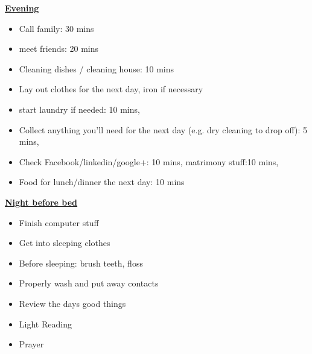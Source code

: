 \begin{columns}
\begin{column}{0.333\columnwidth}
\underline{\bf Evening}
\begin{itemize}
\tiny \item \tiny Call family: 30 mins
\item \tiny meet friends: 20 mins
\item \tiny Cleaning dishes / cleaning house: 10 mins
\item \tiny Lay out clothes for the next day, iron if necessary
\item \tiny start laundry if needed: 10 mins,
\item \tiny Collect anything you’ll need for the next day (e.g. dry
cleaning to drop off): 5 mins,
\item \tiny Check Facebook/linkedin/google+: 10 mins, matrimony stuff:10 mins,
\item \tiny Food for lunch/dinner the next day: 10 mins
\end{itemize}
\underline{\bf Night before bed}
\begin{itemize}
\tiny \item \tiny Finish computer stuff 
\item \tiny Get into sleeping clothes 
\item \tiny Before sleeping: brush teeth, floss  
\item \tiny Properly wash and put away contacts 
\item \tiny Review the days good things  
\item \tiny Light Reading 
\item \tiny Prayer 
\end{itemize}




\end{column}
\end{columns}
